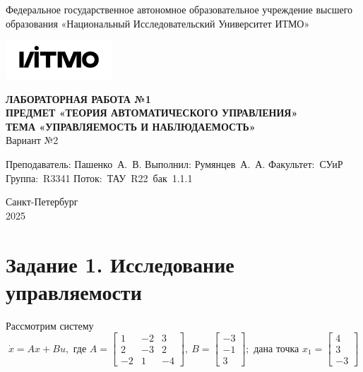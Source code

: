 \documentclass[a4paper, 12pt]{article}
\begin{document}
    \begin{titlepage}

        \begin{center}
        Федеральное государственное автономное образовательное учреждение высшего образования
        «Национальный Исследовательский Университет ИТМО»
        \vfill
        
        \includegraphics[width=0.3\textwidth]{itmo.png} %

        {\large\bf ЛАБОРАТОРНАЯ РАБОТА №1}\\
        {\large\bf ПРЕДМЕТ «ТЕОРИЯ АВТОМАТИЧЕСКОГО УПРАВЛЕНИЯ»}\\
        {\large\bf ТЕМА «УПРАВЛЯЕМОСТЬ И НАБЛЮДАЕМОСТЬ»}\\
        Вариант №2
        \vfill

        \begin{flushright}
            \begin{minipage}{.45\textwidth}
            {
                \hbox{Преподаватель:}
                \hbox{Пашенко А. В.}
                \hbox{}
                \hbox{Выполнил:}
                \hbox{Румянцев А. А.}
                \hbox{}
                \hbox{Факультет: СУиР}
                \hbox{Группа: R3341}
                \hbox{Поток: ТАУ R22 бак 1.1.1}
            }
            \end{minipage}
        \end{flushright}
        \vfill
  
        Санкт-Петербург\\
        2025
        \end{center}
    \end{titlepage}
    
    \tableofcontents

    \newpage
    \section{Задание 1. Исследование управляемости}
    Рассмотрим систему $$\dot{x}=Ax+Bu,\text{ где } A=\begin{bmatrix}
        1 &-2 &3\\
        2 &-3 &2\\
        -2 &1 &-4
    \end{bmatrix},\ B=\begin{bmatrix}
        -3\\
        -1\\
        3
    \end{bmatrix};\text{ дана точка } x_1=\begin{bmatrix}
        4\\
        3\\
        -3
    \end{bmatrix}$$
\end{document}
